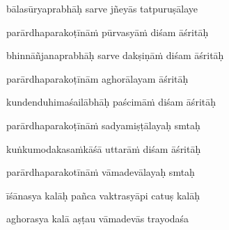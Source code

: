 bālasūryaprabhāḥ sarve jñeyās tatpuruṣālaye\thinspace{\dandab} \dontdisplaylinenum

parārdhaparakoṭīnā\.m pūrvasyā\.m diśam āśritāḥ \veg\dontdisplaylinenum

bhinnāñjanaprabhāḥ sarve dakṣiṇā\.m diśam āśritāḥ\thinspace{\dandab} \dontdisplaylinenum

parārdhaparakoṭīnām aghorālayam āśritāḥ \veg\dontdisplaylinenum

kundenduhimaśailābhāḥ paścimā\.m diśam āśritāḥ\thinspace{\dandab} \dontdisplaylinenum

parārdhaparakoṭīnā\.m sadyamiṣṭālayaḥ smtaḥ \veg\dontdisplaylinenum

kuṅkumodakasa\.mkāśā uttarā\.m diśam āśritāḥ\thinspace{\dandab} \dontdisplaylinenum

parārdhaparakotīnā\.m vāmadevālayaḥ smtaḥ \veg\dontdisplaylinenum

īśānasya kalāḥ pañca vaktrasyāpi catuṣ kalāḥ\thinspace{\dandab} \dontdisplaylinenum

aghorasya kalā aṣṭau vāmadevās trayodaśa \veg\dontdisplaylinenum

